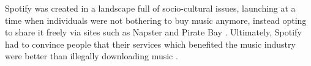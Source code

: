 \par
Spotify was created in a landscape full of socio-cultural issues, launching at a time when individuals were not bothering to buy music anymore, instead opting to share it freely via sites such as Napster and Pirate Bay \parencite{guardian_save_or_destroy}. Ultimately, Spotify had to convince people that their services which benefited the music industry were better than illegally downloading music \parencite{spotify_kills_piracy, spotify_reduce_piracy}.
